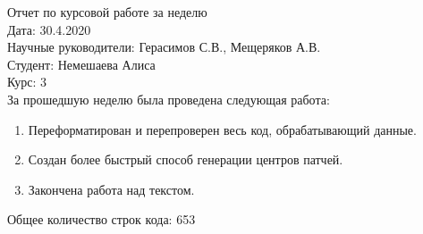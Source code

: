 \documentclass{article}
\begin{document}
Отчет по курсовой работе за неделю\\
Дата: 30.4.2020\\
Научные руководители: Герасимов С.В., Мещеряков А.В.\\
Студент: Немешаева Алиса\\
Курс: 3\\

\renewcommand{\labelitemi}{$\blacksquare$}
\renewcommand\labelitemii{$\square$}
За прошедшую неделю была проведена следующая работа:\\
\begin{enumerate}
    \item Переформатирован и перепроверен весь код, обрабатывающий данные. \\
    \item Создан более быстрый способ генерации центров патчей. \\
    \item Закончена работа над текстом. \\
\end{enumerate}

Общее количество строк кода: 653\\
\end{document}
